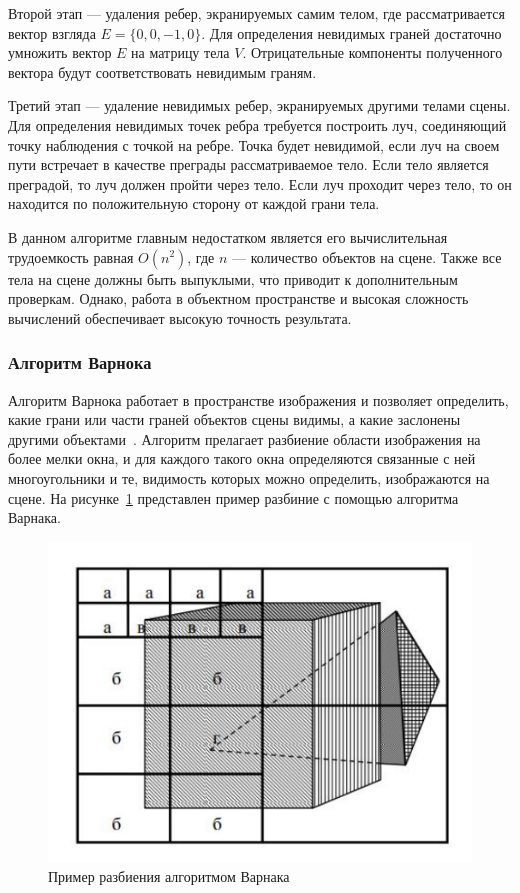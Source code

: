 Второй этап --- удаления ребер, экранируемых самим телом, где рассматривается вектор взгляда $E = \{0, 0, -1, 0\}$.
Для определения невидимых граней достаточно умножить вектор $E$ на матрицу тела $V$. 
Отрицательные компоненты полученного вектора будут соответствовать невидимым граням.

Третий этап --- удаление невидимых ребер, экранируемых другими телами сцены. 
Для определения невидимых точек ребра требуется построить луч, соединяющий точку наблюдения с точкой на ребре. 
Точка будет невидимой, если луч на своем пути встречает в качестве преграды рассматриваемое тело. 
Если тело является преградой, то луч должен пройти через тело. 
Если луч проходит через тело, то он находится по положительную сторону от каждой грани тела.

В данном алгоритме главным недостатком является его вычислительная трудоемкость равная $O(n^2)$, где $n$ --- количество объектов на сцене. Также все тела на сцене должны быть выпуклыми, что приводит к дополнительным проверкам.
Однако, работа в объектном пространстве и высокая сложность вычислений обеспечивает высокую точность результата.

\subsubsection{Алгоритм Варнока}

Алгоритм Варнока работает в пространстве изображения и позволяет определить, какие грани или части граней объектов сцены видимы, а какие заслонены другими объектами~\cite{roders, shikin}. 
Алгоритм прелагает разбиение области изображения на более мелки окна, и для каждого такого окна определяются связанные с ней многоугольники и те, видимость которых можно определить, изображаются на сцене.
На рисунке~\ref{img:varnok} представлен пример разбиние с помощью алгоритма Варнака.

\begin{figure}[h]
	\centering
	\includegraphics[height=0.25\textheight]{img/varnok.png}
	\caption{Пример разбиения алгоритмом Варнака}
	\label{img:varnok}
\end{figure}

